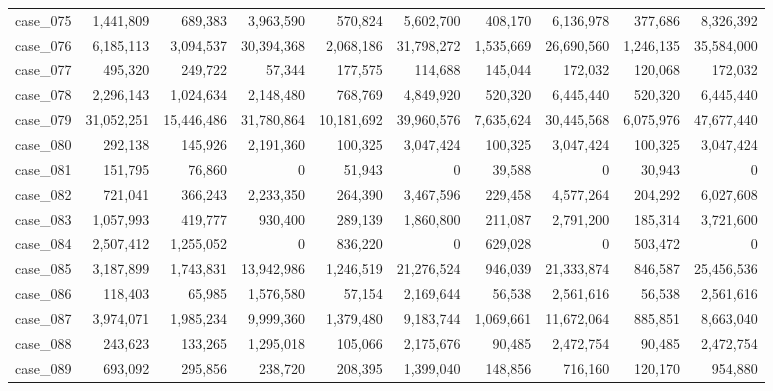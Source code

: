\begin{footnotesize}
\begin{longtable}{l r rr rr rr rr}
case\_075 & 1{,}441{,}809 & 689{,}383 & 3{,}963{,}590 & 570{,}824 & 5{,}602{,}700 & 408{,}170 & 6{,}136{,}978 & 377{,}686 & 8{,}326{,}392 \\
case\_076 & 6{,}185{,}113 & 3{,}094{,}537 & 30{,}394{,}368 & 2{,}068{,}186 & 31{,}798{,}272 & 1{,}535{,}669 & 26{,}690{,}560 & 1{,}246{,}135 & 35{,}584{,}000 \\
case\_077 & 495{,}320 & 249{,}722 & 57{,}344 & 177{,}575 & 114{,}688 & 145{,}044 & 172{,}032 & 120{,}068 & 172{,}032 \\
case\_078 & 2{,}296{,}143 & 1{,}024{,}634 & 2{,}148{,}480 & 768{,}769 & 4{,}849{,}920 & 520{,}320 & 6{,}445{,}440 & 520{,}320 & 6{,}445{,}440 \\
case\_079 & 31{,}052{,}251 & 15{,}446{,}486 & 31{,}780{,}864 & 10{,}181{,}692 & 39{,}960{,}576 & 7{,}635{,}624 & 30{,}445{,}568 & 6{,}075{,}976 & 47{,}677{,}440 \\
case\_080 & 292{,}138 & 145{,}926 & 2{,}191{,}360 & 100{,}325 & 3{,}047{,}424 & 100{,}325 & 3{,}047{,}424 & 100{,}325 & 3{,}047{,}424 \\
case\_081 & 151{,}795 & 76{,}860 & 0 & 51{,}943 & 0 & 39{,}588 & 0 & 30{,}943 & 0 \\
case\_082 & 721{,}041 & 366{,}243 & 2{,}233{,}350 & 264{,}390 & 3{,}467{,}596 & 229{,}458 & 4{,}577{,}264 & 204{,}292 & 6{,}027{,}608 \\
case\_083 & 1{,}057{,}993 & 419{,}777 & 930{,}400 & 289{,}139 & 1{,}860{,}800 & 211{,}087 & 2{,}791{,}200 & 185{,}314 & 3{,}721{,}600 \\
case\_084 & 2{,}507{,}412 & 1{,}255{,}052 & 0 & 836{,}220 & 0 & 629{,}028 & 0 & 503{,}472 & 0 \\
case\_085 & 3{,}187{,}899 & 1{,}743{,}831 & 13{,}942{,}986 & 1{,}246{,}519 & 21{,}276{,}524 & 946{,}039 & 21{,}333{,}874 & 846{,}587 & 25{,}456{,}536 \\
case\_086 & 118{,}403 & 65{,}985 & 1{,}576{,}580 & 57{,}154 & 2{,}169{,}644 & 56{,}538 & 2{,}561{,}616 & 56{,}538 & 2{,}561{,}616 \\
case\_087 & 3{,}974{,}071 & 1{,}985{,}234 & 9{,}999{,}360 & 1{,}379{,}480 & 9{,}183{,}744 & 1{,}069{,}661 & 11{,}672{,}064 & 885{,}851 & 8{,}663{,}040 \\
case\_088 & 243{,}623 & 133{,}265 & 1{,}295{,}018 & 105{,}066 & 2{,}175{,}676 & 90{,}485 & 2{,}472{,}754 & 90{,}485 & 2{,}472{,}754 \\
case\_089 & 693{,}092 & 295{,}856 & 238{,}720 & 208{,}395 & 1{,}399{,}040 & 148{,}856 & 716{,}160 & 120{,}170 & 954{,}880 \\

\end{longtable}
\end{footnotesize}
